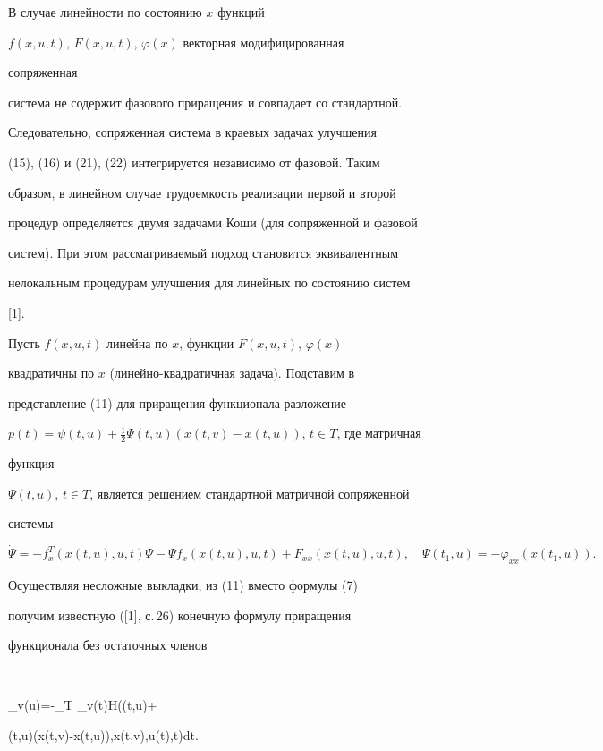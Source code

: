 В случае линейности по состоянию $x$ функций 


$f(x,u,t)$, $F(x,u,t)$, $\varphi(x)$ векторная модифицированная 


сопряженная 


система не содержит фазового приращения и совпадает со стандартной. 


Следовательно, сопряженная система в краевых задачах улучшения 


(15), (16) и (21), (22) интегрируется независимо от фазовой. Таким 


образом, в линейном случае трудоемкость реализации первой и второй


процедур определяется двумя задачами Коши (для сопряженной и фазовой 


систем). При этом рассматриваемый подход становится эквивалентным 


нелокальным процедурам улучшения для линейных по состоянию систем


[1].





Пусть $f(x,u,t)$ линейна по $x$, функции $F(x,u,t)$, $\varphi(x)$


квадратичны по $x$ (линейно-квад\-ра\-тич\-ная задача). Подставим в 


представление (11) для приращения функционала разложение


$p(t)=\psi(t,u)+\frac{1}{2}\Psi(t,u)(x(t,v)-x(t,u))$, $t\in T$, где матричная 


функция 


$\Psi(t,u)$, $t\in T$, является решением стандартной матричной сопряженной


системы


$$


\dot\Psi=-f^T_x(x(t,u),u,t)\Psi-\Psi f_x(x(t,u),u,t)+


F_{xx}(x(t,u),u,t),\quad \Psi(t_1,u)=-\varphi_{xx}(x(t_1,u)).


$$





Осуществляя несложные выкладки, из (11) вместо формулы (7) 


получим известную ([1], с.\,26) конечную формулу приращения 


функционала без остаточных членов


$$


\Delta_v\Phi(u)=-\int_T \Delta_{v(t)}H(\psi(t,u)+


\Psi(t,u)(x(t,v)-x(t,u)),x(t,v),u(t),t)dt.


